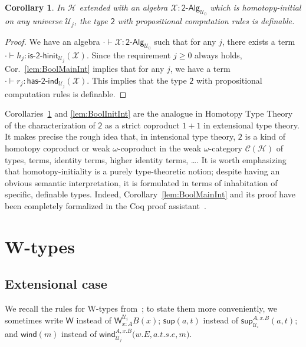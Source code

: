 \documentclass[11pt]{article}
\newcommand{\X}{\mathcal{X}}
\newcommand{\W}{\mathsf{W}}
\newcommand{\wsup}{\mathsf{sup}}
\newcommand{\wind}{\mathsf{wind}}
\newcommand{\Bool}{\mathsf{2}}
\newcommand{\UU}{\mathcal{U}}
\newcommand{\BoolAlg}{\mathsf{2}\text{-}\mathsf{Alg}}
\newcommand{\HasBoolInd}{\mathsf{has}\text{-}\mathsf{2}\text{-}\mathsf{ind}}
\newcommand{\IsBoolHInit}{\mathsf{is}\text{-}\mathsf{2}\text{-}\mathsf{hinit}}
\newcommand{\Hint}{\mathcal{H}}
\newtheorem{corollary}[theorem]{Corollary}
\theoremstyle{definition}
\begin{document}
\begin{corollary}\label{lem:BoolCharInt}
In $\Hint$ extended with an algebra $\X : \BoolAlg_{\UU_0}$ which is homotopy-initial on any universe $\UU_j$, the type $\Bool$ with propositional computation rules is definable. 
\end{corollary}
\begin{proof}
We have an algebra $\cdot \vdash \X : \BoolAlg_{\UU_0}$ such that for any $j$, there exists a term $\cdot \vdash h_j  : \IsBoolHInit_{\UU_j}(\X)$. Since the requirement $j \geq 0$ always holds, Cor.~\ref{lem:BoolMainInt} implies that for any $j$, we have a term $\cdot \vdash r_j : \HasBoolInd_{\UU_j}(\X)$. This implies that the type $\Bool$ with propositional computation rules is definable.
\end{proof}

Corollaries~\ref{lem:BoolCharInt} and \ref{lem:BoolInitInt} are the analogue in Homotopy Type Theory of the characterization of 
$\Bool$ as a strict coproduct $1+1$ in extensional type theory. It makes precise the rough idea that, 
in intensional type theory, $\Bool$ is a kind of homotopy coproduct or weak $\omega$-coproduct 
in the weak $\omega$-category $\mathcal{C}(\Hint)$ of types, terms, identity terms, higher identity terms, \ldots.  
It is worth emphasizing that homotopy-initiality is a purely type-theoretic notion; despite having an obvious semantic interpretation, it is formulated in terms of inhabitation of specific, definable types. Indeed, Corollary~\ref{lem:BoolMainInt} and its proof have been completely formalized in the Coq proof assistant~\cite{AwodeyS:indtht}.






\section{W-types}
\label{section:wfiles}

\subsection{Extensional case}

We recall the rules for W-types from~\cite{MartinLofP:inttt}; to state them more conveniently, we sometimes write $\W$ instead of $\W^{\UU_i}_{x : A}B(x)$; $\wsup(a,t)$ instead of $\wsup^{A,x.B}_{\UU_i}(a,t)$; and $\wind(m)$ instead of $\wind^{A,x.B}_{\UU_j}\big(w.E,a.t.s.e,m\big)$.
\end{document}
